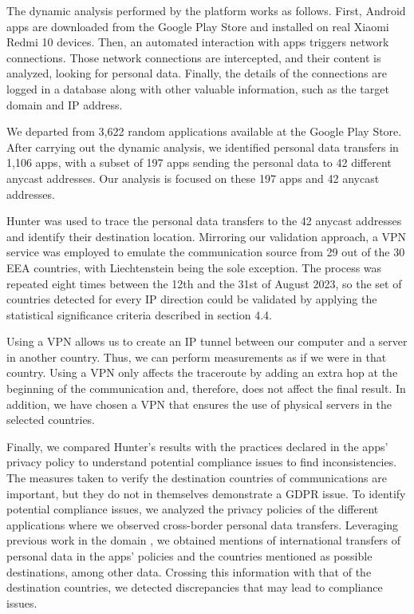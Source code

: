 \documentclass[preprint,12pt]{elsarticle}
\begin{document}
The dynamic analysis performed by the platform works as follows. First, Android apps are downloaded from the Google Play Store and installed on real Xiaomi Redmi 10 devices. Then, an automated interaction with apps triggers network connections. Those network connections are intercepted, and their content is analyzed, looking for personal data. Finally, the details of the connections are logged in a database along with other valuable information, such as the target domain and IP address.

We departed from 3,622 random applications available at the Google Play Store. After carrying out the dynamic analysis, we identified personal data transfers in 1,106 apps, with a subset of 197 apps sending the personal data to 42 different anycast addresses. Our analysis is focused on these 197 apps and 42 anycast addresses.

Hunter was used to trace the personal data transfers to the 42 anycast addresses and identify their destination location. Mirroring our validation approach, a VPN service was employed to emulate the communication source from 29 out of the 30 EEA countries, with Liechtenstein being the sole exception. The process was repeated eight times between the 12th and the 31st of August 2023, so the set of countries detected for every IP direction could be validated by applying the statistical significance criteria described in section 4.4.

Using a VPN allows us to create an IP tunnel between our computer and a server in another country. Thus, we can perform measurements as if we were in that country. Using a VPN only affects the traceroute by adding an extra hop at the beginning of the communication and, therefore, does not affect the final result. In addition, we have chosen a VPN that ensures the use of physical servers in the selected countries.

Finally, we compared Hunter's results with the practices declared in the apps’ privacy policy to understand potential compliance issues to find inconsistencies. The measures taken to verify the destination countries of communications are important, but they do not in themselves demonstrate a GDPR issue. To identify potential compliance issues, we analyzed the privacy policies of the different applications where we observed cross-border personal data transfers. Leveraging previous work in the domain \cite{Guaman2023AutomatedApplications}, we obtained mentions of international transfers of personal data in the apps’ policies and the countries mentioned as possible destinations, among other data. Crossing this information with that of the destination countries, we detected discrepancies that may lead to compliance issues.
\end{document}
